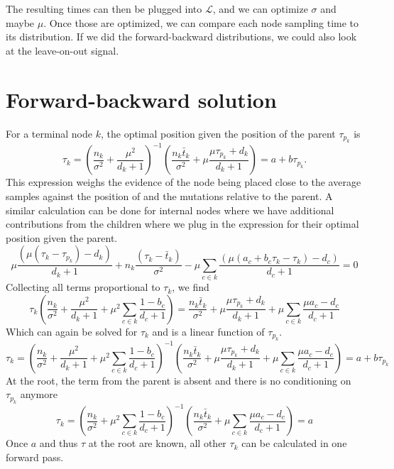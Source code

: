 \documentclass[aps,rmp, onecolumn]{revtex4}
\newcommand{\LH}{\mathcal{L}}
\begin{document}
The resulting times can then be plugged into $\LH$, and we can optimize $\sigma$ and maybe $\mu$.
Once those are optimized, we can compare each node sampling time to its distribution.
If we did the forward-backward distributions, we could also look at the leave-on-out signal.



\section*{Forward-backward solution}
For a terminal node $k$, the optimal position given the position of the parent $\tau_{p_k}$ is
\begin{equation}
\tau_k =  \left(\frac{n_k}{\sigma^2} + \frac{\mu^2}{d_k+1}\right)^{-1}\left(\frac{n_k \bar{t}_k}{\sigma^2} + \mu\frac{\mu\tau_{p_k} + d_k}{d_k+1}\right) = a + b\tau_{p_k}.
\end{equation}
This expression weighs the evidence of the node being placed close to the average samples against the position of and the mutations relative to the parent.
A similar calculation can be done for internal nodes where we have additional contributions from the children where we plug in the expression for their optimal position given the parent.
\begin{equation}
    \mu\frac{(\mu(\tau_k - \tau_{p_k}) -  d_k)}{d_k+1} +  n_k\frac{(\tau_k-\bar{t}_k)}{\sigma^2} -  \mu\sum_{c\in k} \frac{(\mu(a_c + b_c \tau_{k} - \tau_{k}) - d_c)}{d_c+1} = 0
\end{equation}
Collecting all terms proportional to $\tau_k$, we find
\begin{equation}
\tau_k\left(\frac{n_k}{\sigma^2} + \frac{\mu^2}{d_k+1} + \mu^2\sum_{c\in k} \frac{1-b_c}{d_c+1}\right) =
\frac{n_k \bar{t}_k}{\sigma^2} + \mu\frac{\mu\tau_{p_k} + d_k}{d_k+1} + \mu \sum_{c\in k}\frac{\mu a_c - d_c}{d_c+1}
\end{equation}
Which can again be solved for $\tau_k$ and is a linear function of $\tau_{p_k}$.
\begin{equation}
    \tau_k =\left(\frac{n_k}{\sigma^2} + \frac{\mu^2}{d_k+1} + \mu^2\sum_{c\in k} \frac{1-b_c}{d_c+1}\right)^{-1}\left(
    \frac{n_k \bar{t}_k}{\sigma^2} + \mu\frac{\mu\tau_{p_k} + d_k}{d_k+1} + \mu \sum_{c\in k}\frac{\mu a_c - d_c}{d_c+1}\right) = a + b \tau_{p_k}
\end{equation}
At the root, the term from the parent is absent and there is no conditioning on $\tau_{p_k}$ anymore
\begin{equation}
    \tau_k =\left(\frac{n_k}{\sigma^2} + \mu^2\sum_{c\in k} \frac{1-b_c}{d_c+1}\right)^{-1}\left(
    \frac{n_k \bar{t}_k}{\sigma^2} + \mu \sum_{c\in k}\frac{\mu a_c - d_c}{d_c+1}\right) = a
\end{equation}
Once $a$ and thus $\tau$  at the root are known, all other $\tau_k$ can be calculated in one forward pass.
\end{document}
